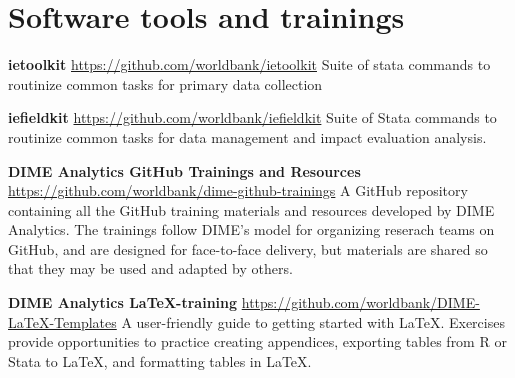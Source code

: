 \section{Software tools and trainings}

\textbf{ietoolkit} 
\url{https://github.com/worldbank/ietoolkit}
Suite of stata commands to routinize common tasks for primary data collection

\textbf{iefieldkit} 
\url{https://github.com/worldbank/iefieldkit}
Suite of Stata commands to routinize common tasks for data management and impact evaluation analysis. 

\textbf{DIME Analytics GitHub Trainings and Resources}
\url{https://github.com/worldbank/dime-github-trainings}
A GitHub repository containing all the GitHub training materials and resources developed by DIME Analytics. The trainings follow DIME's model for organizing reserach teams on GitHub, and are designed for face-to-face delivery, but materials are shared so that they may be used and adapted by others. 

\textbf{DIME Analytics \LaTeX-training}
\url{https://github.com/worldbank/DIME-LaTeX-Templates}
A user-friendly guide to getting started with LaTeX. Exercises provide opportunities to practice creating appendices, exporting tables from R or Stata to LaTeX, and formatting tables in LaTeX. 




\mainmatter
